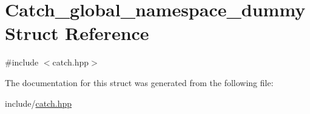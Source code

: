 \hypertarget{struct_catch__global__namespace__dummy}{}\section{Catch\+\_\+global\+\_\+namespace\+\_\+dummy Struct Reference}
\label{struct_catch__global__namespace__dummy}


{\ttfamily \#include $<$catch.\+hpp$>$}



The documentation for this struct was generated from the following file\+:\begin{DoxyCompactItemize}
\item 
include/\mbox{\hyperlink{catch_8hpp}{catch.\+hpp}}\end{DoxyCompactItemize}
